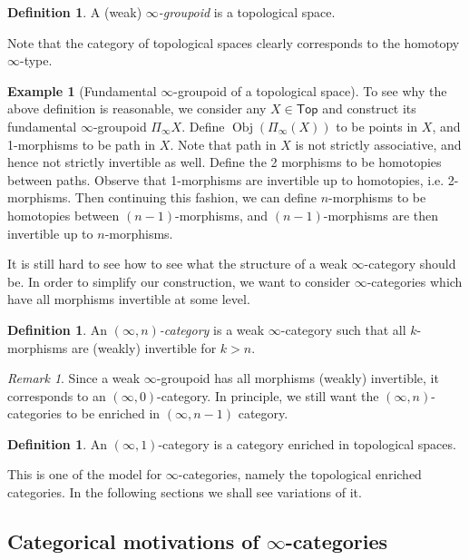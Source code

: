 \documentclass[12pt]{amsart}
\theoremstyle{definition}
\newtheorem{example}[thm]{Example}
\newtheorem{defn}[thm]{Definition}
\theoremstyle{remark}
\newtheorem{rem}[thm]{Remark}
\numberwithin{equation}{section}
\newcommand{\1}{{\mathbb{1}}}
\newcommand{\ob}{\operatorname{Obj}}
\newcommand{\Top}{\mathsf{Top}}
\begin{document}
\begin{defn}
	A (weak) {\it $\infty$-groupoid} is a topological space.
\end{defn}
Note that the category of topological spaces clearly corresponds to the homotopy $\infty$-type. 

\begin{example}[Fundamental $\infty$-groupoid of a topological space]
	To see why the above definition is reasonable, we consider any $X\in \Top$ and construct its fundamental $\infty$-groupoid $\Pi_{\infty} X$. Define $\ob (\Pi_{\infty}(X))$ to be points in $X$, and 1-morphisms to be path in $X$. Note that path in $X$ is not strictly associative, and hence not strictly invertible as well. Define the 2 morphisms to be homotopies between paths. Observe that 1-morphisms are invertible up to homotopies, i.e. 2-morphisms. Then continuing this fashion, we can define $n$-morphisms to be homotopies between $(n-1)$-morphisms, and $(n-1)$-morphisms are then invertible up to $n$-morphisms.
\end{example}

It is still hard to see how to see what the structure of a weak $\infty$-category should be. In order to simplify our construction, we want to consider $\infty$-categories which have all morphisms invertible at some level.

\begin{defn}
	An {\it $(\infty,n)$-category} is a weak $\infty$-category such that all $k$-morphisms are (weakly) invertible for $k>n$. 
\end{defn}

\begin{rem}
	Since a weak $\infty$-groupoid has all morphisms (weakly) invertible, it corresponds to an $(\infty,0)$-category. In principle, we still want the $(\infty, n)$-categories to be enriched in $(\infty, n-1)$ category.
\end{rem}
\begin{defn}
	An $(\infty,1)$-category is a category enriched in topological spaces.
\end{defn}
This is one of the model for $\infty$-categories, namely the topological enriched categories. In the following sections we shall see variations of it.
\subsection{Categorical motivations of $\infty$-categories}
\end{document}
